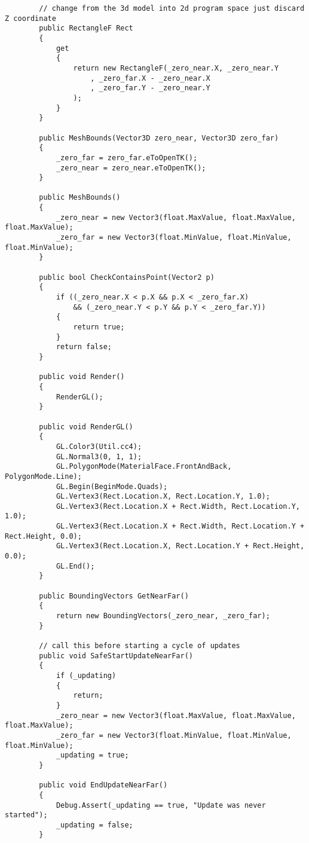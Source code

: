 \begin{scriptsize}
\begin{verbatim}
        // change from the 3d model into 2d program space just discard Z coordinate
        public RectangleF Rect
        {
            get
            {
                return new RectangleF(_zero_near.X, _zero_near.Y
                    , _zero_far.X - _zero_near.X
                    , _zero_far.Y - _zero_near.Y
                );
            }
        }

        public MeshBounds(Vector3D zero_near, Vector3D zero_far)
        {
            _zero_far = zero_far.eToOpenTK();
            _zero_near = zero_near.eToOpenTK();
        }

        public MeshBounds()
        {
            _zero_near = new Vector3(float.MaxValue, float.MaxValue, float.MaxValue);
            _zero_far = new Vector3(float.MinValue, float.MinValue, float.MinValue);
        }

        public bool CheckContainsPoint(Vector2 p)
        {
            if ((_zero_near.X < p.X && p.X < _zero_far.X)
                && (_zero_near.Y < p.Y && p.Y < _zero_far.Y))
            {
                return true;
            }
            return false;
        }

        public void Render()
        {
            RenderGL();
        }

        public void RenderGL()
        {
            GL.Color3(Util.cc4);
            GL.Normal3(0, 1, 1);
            GL.PolygonMode(MaterialFace.FrontAndBack, PolygonMode.Line);
            GL.Begin(BeginMode.Quads);
            GL.Vertex3(Rect.Location.X, Rect.Location.Y, 1.0);
            GL.Vertex3(Rect.Location.X + Rect.Width, Rect.Location.Y, 1.0);
            GL.Vertex3(Rect.Location.X + Rect.Width, Rect.Location.Y + Rect.Height, 0.0);
            GL.Vertex3(Rect.Location.X, Rect.Location.Y + Rect.Height, 0.0);
            GL.End();
        }

        public BoundingVectors GetNearFar()
        {
            return new BoundingVectors(_zero_near, _zero_far);
        }

        // call this before starting a cycle of updates
        public void SafeStartUpdateNearFar()
        {
            if (_updating)
            {
                return;
            }
            _zero_near = new Vector3(float.MaxValue, float.MaxValue, float.MaxValue);
            _zero_far = new Vector3(float.MinValue, float.MinValue, float.MinValue);
            _updating = true;
        }

        public void EndUpdateNearFar()
        {
            Debug.Assert(_updating == true, "Update was never started");
            _updating = false;
        }


\end{verbatim}
\end{scriptsize}

